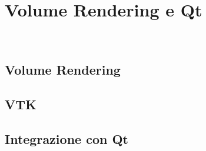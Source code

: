 
\chapter{Volume Rendering e Qt}
\label{cap:teoria-stage}

\\

\section{Volume Rendering}

\section{VTK}

\section{Integrazione con Qt}

